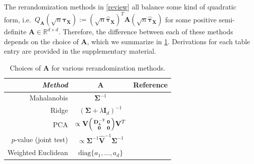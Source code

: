 \documentclass[11pt,twoside]{article}
\theoremstyle{definition}
\theoremstyle{remark}
\begin{document}
The rerandomization methods in \cref{review} all balance some kind of quadratic form, i.e.\ $Q_{\mathbf{A}}(\sqrt{n} \widehat{\bm{\tau}}_{\mathbf{X}}) := (\sqrt{n} \widehat{\bm{\tau}}_{\mathbf{X}})^T \mathbf{A} (\sqrt{n} \widehat{\bm{\tau}}_{\mathbf{X}})$ for some positive semi-definite $\mathbf{A} \in \mathbb{R}^{d \times d}$. Therefore, the difference between each of these methods depends on the choice of $\mathbf{A}$, which we summarize in \cref{a_table}. Derivations for each table entry are provided in the supplementary material.
\begin{table}[h]
\centering
\begin{tabular}{r|c|c}
\textit{Method} & $\mathbf{A}$ & Reference\\ \hline
Mahalanobis & $\mathbf{\Sigma}^{-1}$  & \cite{morgan2012rerandomization, morgan2015rerandomization} \\[0.05in]
Ridge & $(\mathbf{\Sigma} + \lambda \mathbf{I}_d)^{-1}$ & \cite{branson2021ridge}  \\[0.05in]
PCA & $\propto \mathbf{V} \begin{psmallmatrix}
        \mathbf{D}^{-2}_k & \mathbf{0} \\
        \mathbf{0} & \mathbf{0}
    \end{psmallmatrix} \mathbf{V}^T$ & \cite{zhang2023pca} \\[0.05in]
$p$-value (joint test) & $\propto \mathbf{\Sigma}^{-1} \widehat{\mathbf{V}}^{-1} \mathbf{\Sigma}^{-1}$ & \cite{zhao2021no} \\[0.05in]
Weighted Euclidean & $\text{diag}\{a_1, \ldots, a_d\}$ & \cite{lu2023design}
\end{tabular}
\caption{Choices of $\mathbf{A}$ for various rerandomization methods.}
\label{a_table}
\end{table}
\end{document}
